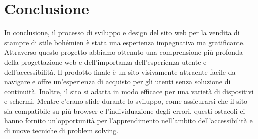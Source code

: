 \documentclass[11pt]{article}
\begin{document}
\section{Conclusione}
\label{sec:orgff2c60e}
In conclusione, il processo di sviluppo e design del sito web per la vendita di stampre di stile bohémien è stata una esperienza impegnativa ma gratificante. Attraverso questo progetto abbiamo ottenuto una comprensione più profonda della progettazione web e dell'importanza dell'esperienza utente e dell'accessibilità. Il prodotto finale è un sito visivamente attraente facile da navigare e offre un'esperienza di acquisto per gli utenti senza soluzione di continuità. Inoltre, il sito si adatta in modo efficace per una varietà di dispositivi e schermi. Mentre c'erano sfide durante lo sviluppo, come assicurarsi che il sito sia compatibile su più browser e l'individuazione degli errori, questi ostacoli ci hanno fornito un'opportunità per l'apprendimento nell'ambito dell'accessibilità e di nuove tecniche di problem solving.
\end{document}
